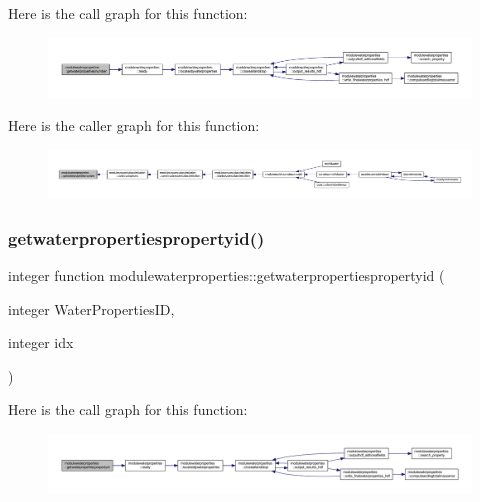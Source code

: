 Here is the call graph for this function\+:\nopagebreak
\begin{figure}[H]
\begin{center}
\leavevmode
\includegraphics[width=350pt]{namespacemodulewaterproperties_a6e98b7d8e639a6feac4f88974d90c5e5_cgraph}
\end{center}
\end{figure}
Here is the caller graph for this function\+:\nopagebreak
\begin{figure}[H]
\begin{center}
\leavevmode
\includegraphics[width=350pt]{namespacemodulewaterproperties_a6e98b7d8e639a6feac4f88974d90c5e5_icgraph}
\end{center}
\end{figure}
\mbox{\label{namespacemodulewaterproperties_ab28fc6f29d4d9d76db5238daf0715caf}} 
\subsubsection{\texorpdfstring{getwaterpropertiespropertyid()}{getwaterpropertiespropertyid()}}
{\footnotesize\ttfamily integer function modulewaterproperties\+::getwaterpropertiespropertyid (\begin{DoxyParamCaption}\item[{integer}]{Water\+Properties\+ID,  }\item[{integer}]{idx }\end{DoxyParamCaption})\hspace{0.3cm}{\ttfamily [private]}}

Here is the call graph for this function\+:\nopagebreak
\begin{figure}[H]
\begin{center}
\leavevmode
\includegraphics[width=350pt]{namespacemodulewaterproperties_ab28fc6f29d4d9d76db5238daf0715caf_cgraph}
\end{center}
\end{figure}
\mbox{\label{namespacemodulewaterproperties_aa92bc10cfb8ceb9e3edd659ae8e6ed71}} 
